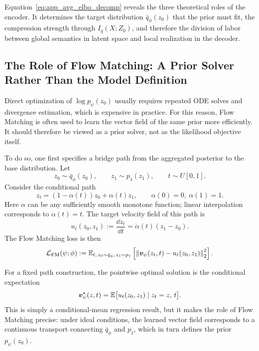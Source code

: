 Equation~\eqref{eq:app_avg_elbo_decomp} reveals the three theoretical roles of the encoder. It determines the target distribution $\bar q_{\phi}(z_0)$ that the prior must fit, the compression strength through $I_q(X;Z_0)$, and therefore the division of labor between global semantics in latent space and local realization in the decoder.

\subsection{The Role of Flow Matching: A Prior Solver Rather Than the Model Definition}
\label{app:fm_role}

Direct optimization of $\log p_{\psi}(z_0)$ usually requires repeated ODE solves and divergence estimation, which is expensive in practice. For this reason, Flow Matching is often used to learn the vector field of the same prior more efficiently. It should therefore be viewed as a prior solver, not as the likelihood objective itself.

To do so, one first specifies a bridge path from the aggregated posterior to the base distribution. Let
\begin{equation}
z_0\sim \bar q_{\phi}(z_0),
\qquad
z_1\sim p_1(z_1),
\qquad
t\sim U[0,1].
\label{eq:app_fm_sampling}
\end{equation}
Consider the conditional path
\begin{equation}
z_t=(1-\alpha(t))z_0+\alpha(t)z_1,
\qquad
\alpha(0)=0,
\ \alpha(1)=1.
\label{eq:app_general_fm_path}
\end{equation}
Here $\alpha$ can be any sufficiently smooth monotone function; linear interpolation corresponds to $\alpha(t)=t$. The target velocity field of this path is
\begin{equation}
u_t(z_0,z_1)
:=
\frac{\dd z_t}{\dd t}
=
\dot\alpha(t)(z_1-z_0).
\label{eq:app_fm_target_velocity}
\end{equation}
The Flow Matching loss is then
\begin{equation}
\mathcal{L}_{\mathrm{FM}}(\psi;\phi)
:=
\mathbb{E}_{t,\,z_0\sim \bar q_{\phi},\,z_1\sim p_1}
\left[
\left\|\bm{v}_{\psi}(z_t,t)-u_t(z_0,z_1)\right\|_2^2
\right].
\label{eq:app_fm_loss}
\end{equation}

For a fixed path construction, the pointwise optimal solution is the conditional expectation
\begin{equation}
\bm{v}_{\psi}^{\star}(z,t)
=
\mathbb{E}\bigl[u_t(z_0,z_1)\mid z_t=z,\,t\bigr].
\label{eq:app_fm_optimal_field}
\end{equation}
This is simply a conditional-mean regression result, but it makes the role of Flow Matching precise: under ideal conditions, the learned vector field corresponds to a continuous transport connecting $\bar q_{\phi}$ and $p_1$, which in turn defines the prior $p_{\psi}(z_0)$.

